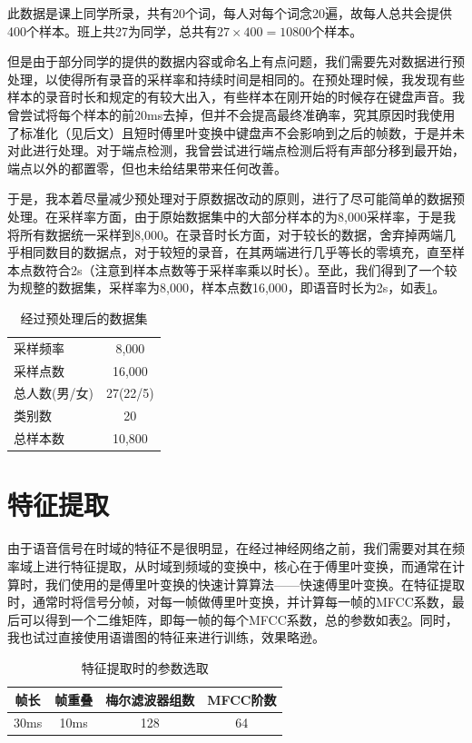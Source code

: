 \documentclass[12pt]{article} %
\begin{document}
此数据是课上同学所录，共有20个词，每人对每个词念20遍，故每人总共会提供400个样本。班上共27为同学，总共有$27\times400=10800$个样本。

但是由于部分同学的提供的数据内容或命名上有点问题，我们需要先对数据进行预处理，以使得所有录音的采样率和持续时间是相同的。在预处理时候，我发现有些样本的录音时长和规定的有较大出入，有些样本在刚开始的时候存在键盘声音。我曾尝试将每个样本的前20ms去掉，但并不会提高最终准确率，究其原因时我使用了标准化（见后文）且短时傅里叶变换中键盘声不会影响到之后的帧数，于是并未对此进行处理。对于端点检测，我曾尝试进行端点检测后将有声部分移到最开始，端点以外的都置零，但也未给结果带来任何改善。

于是，我本着尽量减少预处理对于原数据改动的原则，进行了尽可能简单的数据预处理。在采样率方面，由于原始数据集中的大部分样本的为8,000采样率，于是我将所有数据统一采样到8,000。在录音时长方面，对于较长的数据，舍弃掉两端几乎相同数目的数据点，对于较短的录音，在其两端进行几乎等长的零填充，直至样本点数符合2s（注意到样本点数等于采样率乘以时长）。至此，我们得到了一个较为规整的数据集，采样率为8,000，样本点数16,000，即语音时长为2s，如表\ref{tb:dataset}。

\begin{table}[ht]
\caption{经过预处理后的数据集}
\label{tb:dataset}
\centering
\begin{tabular}{lc}
\hline
采样频率 & 8,000 \\ 
采样点数 & 16,000 \\
\hline
总人数(男/女) & 27(22/5) \\
类别数 & 20 \\
总样本数 & 10,800 \\ 

\hline
\end{tabular} 
\end{table}


\section{特征提取}
由于语音信号在时域的特征不是很明显，在经过神经网络之前，我们需要对其在频率域上进行特征提取，从时域到频域的变换中，核心在于傅里叶变换，而通常在计算时，我们使用的是傅里叶变换的快速计算算法——快速傅里叶变换。在特征提取时，通常时将信号分帧，对每一帧做傅里叶变换，并计算每一帧的MFCC系数，最后可以得到一个二维矩阵，即每一帧的每个MFCC系数，总的参数如表\ref{tb:fparams}。同时，我也试过直接使用语谱图的特征来进行训练，效果略逊。

\begin{table}
\caption{特征提取时的参数选取}
\label{tb:fparams}
\centering
\begin{tabular}{cccc}
\hline
帧长 & 帧重叠 & 梅尔滤波器组数 & MFCC阶数 \\ 
\hline
30ms & 10ms &  128 & 64 \\
\hline
\end{tabular} 
\end{table}
\end{document}

